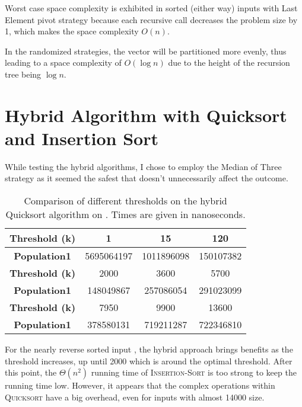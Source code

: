 Worst case space complexity is exhibited in sorted (either way) inputs with Last Element pivot strategy because each recursive call decreases the problem size by 1, which makes the space complexity $O(n)$.

In the randomized strategies, the vector will be partitioned more evenly, thus leading to a space complexity of $O(\log n)$ due to the height of the recursion tree being $\log n$.


\section{Hybrid Algorithm with Quicksort and Insertion Sort}

While testing the hybrid algorithms, I chose to employ the Median of Three strategy as it seemed the safest that doesn't unnecessarily affect the outcome.

\begin{table}[H]
\centering
\begin{tabular}{|c|c|c|c|}
\hline
\textbf{Threshold (k)} & 1 & 15 & 120 \\ \hline
\textbf{Population1}   & 5695064197 & 1011896098 & 150107382 \\ \hline
\hline
\textbf{Threshold (k)} & 2000 & 3600 & 5700 \\ \hline
\textbf{Population1}   & 148049867 & 257086054 & 291023099 \\ \hline
\hline
\textbf{Threshold (k)} & 7950 & 9900 & 13600 \\ \hline
\textbf{Population1}   & 378580131 & 719211287 & 722346810 \\ \hline
\end{tabular}
\caption{Comparison of different thresholds on the hybrid Quicksort algorithm on . Times are given in nanoseconds.}
\label{table:pop1}
\end{table}

For the nearly reverse sorted input , the hybrid approach brings benefits as the threshold increases, up until 2000 which is around the optimal threshold. After this point, the $\Theta(n^2)$ running time of \textsc{Insertion-Sort} is too strong to keep the running time low. However, it appears that the complex operations within \textsc{Quicksort} have a big overhead, even for inputs with almost 14000 size.

